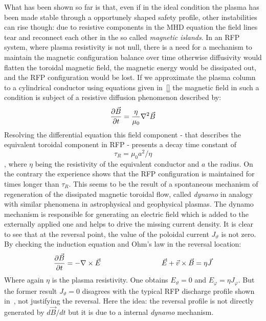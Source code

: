 What has been shown so far is that, even if in the ideal condition the plasma has been made stable through a opportunely shaped safety profile, other instabilities can rise though: due to resistive components in the MHD equation the field lines tear and reconnect each other in the so called \textit{magnetic islands}.
In an RFP system, where plasma resistivity is not null, there is a need for a mechanism to maintain the magnetic configuration balance over time otherwise diffusivity would flatten the toroidal magnetic field, the magnetic energy would be dissipated out, and the RFP configuration would be lost.
If we approximate the plasma column to a cylindrical conductor using equations given in~\eqref{} the magnetic field in such a condition is subject of a resistive diffusion phenomenon described by:
\begin{equation}
    \pdv{\Vec{B}}{t} = \frac{\eta}{\mu_0} \nabla^2 \Vec{B}
\end{equation}
Resolving the differential equation this field component - that describes the equivalent toroidal component in RFP - presents a decay time constant of $$\tau_R = \mu_0 a^2 / \eta$$, where $\eta$ being the resistivity of the equivalent conductor and $a$ the radius.
On the contrary the experience shows that the RFP configuration is maintained for times longer than $\tau_R$. This seems to be the result of a spontaneous mechanism of regeneration of the dissipated magnetic toroidal flow, called \textit{dynamo} in analogy with similar phenomena in astrophysical and geophysical plasmas. The dynamo mechanism is responsible for generating an electric field which is added to the externally applied one and helps to drive the missing current density. 
It is clear to see that at the reversal point, the value of the poloidal current $J_\vartheta$ is not zero. By checking the induction equation and Ohm’s law in the reversal location:
\begin{equation*}
    \pdv{\Vec{B}}{t} = - \nabla \times \Vec{E}  \hspace{3cm} \Vec{E} + \Vec{v} \times \Vec{B} = \eta \Vec{J}
\end{equation*}
Where again $\eta$ is the plasma resistivity. One obtains $E_\vartheta = 0$ and $E_\varphi = \eta J_\varphi$. But the former
result $J_\vartheta = 0$ disagrees with the typical RFP discharge profile shown in~\Figure{\ref{}}, not justifying the reversal.
Here the idea: the reversal profile is not directly generated by $d\Vec{B}/dt$ but it is due to a internal \textit{dynamo} mechanism.

